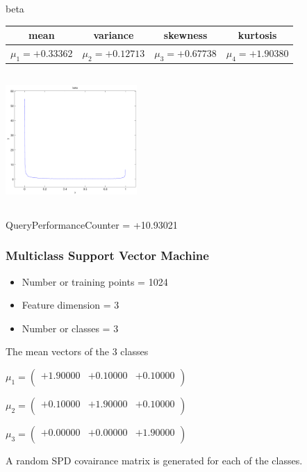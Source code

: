 \documentclass[9pt]{article}
\theoremstyle{plain}
\theoremstyle{definition}
\theoremstyle{remark}
\numberwithin{equation}{section}
\begin{document}
\newpage
beta \begin{tabular}{|c|c|c|c|}  mean & variance & skewness & kurtosis \\  \hline
$\mu_1 = +0.33362$ & $\mu_2 = +0.12713$ & $\mu_3 = +0.67738$ & $\mu_4 =+1.90380$ \\
\end{tabular}

\includegraphics[width=5cm,height=5cm]{beta.pdf}

QueryPerformanceCounter  =  +10.93021
\subsubsection{Multiclass Support Vector Machine }
\begin{itemize}
\item Number or training points = 1024
\item Feature dimension = 3
\item Number or classes = 3
\end{itemize}
{The mean vectors of the 3 classes}

$\mu_1 = \left(
\begin{array}{
ccc}
+1.90000 & +0.10000 & +0.10000 \\
\end{array}
\right)$ \newline 

$\mu_2 = \left(
\begin{array}{
ccc}
+0.10000 & +1.90000 & +0.10000 \\
\end{array}
\right)$ \newline 

$\mu_3 = \left(
\begin{array}{
ccc}
+0.00000 & +0.00000 & +1.90000 \\
\end{array}
\right)$ \newline 

A random SPD covairance matrix is generated for each of the classes.\newline
\end{document}
